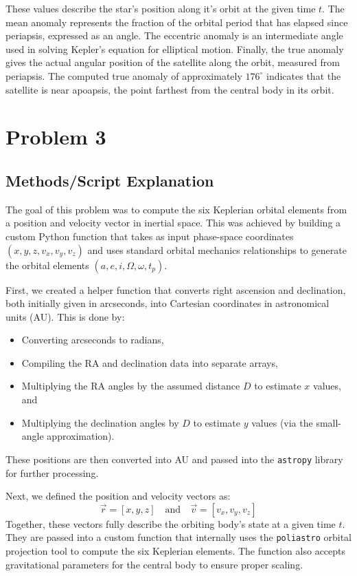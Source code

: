 \documentclass[linenumbers,trackchanges,astrosymb,]{aastex7}
\begin{document}
These values describe the star's position along it's orbit at the given time $t$. The mean anomaly represents the fraction of the orbital period that has elapsed since periapsis, expressed as an angle. The eccentric anomaly is an intermediate angle used in solving Kepler’s equation for elliptical motion. Finally, the true anomaly gives the actual angular position of the satellite along the orbit, measured from periapsis. The computed true anomaly of approximately $176^\circ$ indicates that the satellite is near apoapsis, the point farthest from the central body in its orbit.

\section{Problem 3}
\subsection{Methods/Script Explanation}

The goal of this problem was to compute the six Keplerian orbital elements from a position and velocity vector in inertial space. This was achieved by building a custom Python function that takes as input phase-space coordinates $(x, y, z, v_x, v_y, v_z)$ and uses standard orbital mechanics relationships to generate the orbital elements $(a, e, i, \Omega, \omega, t_p)$.

First, we created a helper function that converts right ascension and declination, both initially given in arcseconds, into Cartesian coordinates in astronomical units (AU). This is done by:
\begin{itemize}
  \item Converting arcseconds to radians,
  \item Compiling the RA and declination data into separate arrays,
  \item Multiplying the RA angles by the assumed distance $D$ to estimate $x$ values, and
  \item Multiplying the declination angles by $D$ to estimate $y$ values (via the small-angle approximation).
\end{itemize}
These positions are then converted into AU and passed into the \texttt{astropy} library for further processing.

Next, we defined the position and velocity vectors as:
\[
\vec{r} = [x, y, z] \quad \text{and} \quad \vec{v} = [v_x, v_y, v_z]
\]
Together, these vectors fully describe the orbiting body's state at a given time $t$. They are passed into a custom function that internally uses the \texttt{poliastro} orbital projection tool to compute the six Keplerian elements. The function also accepts gravitational parameters for the central body to ensure proper scaling.
\end{document}
